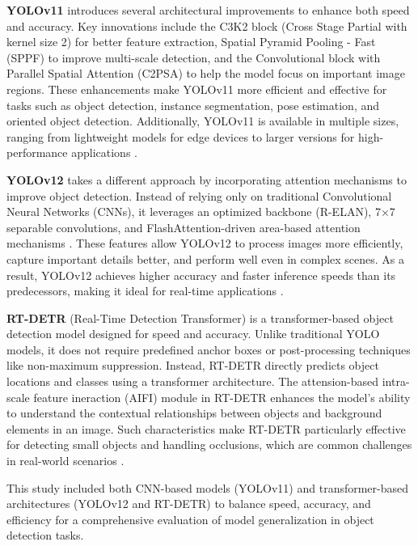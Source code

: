 \textbf{YOLOv11} introduces several architectural improvements to enhance both speed and accuracy. Key innovations include the C3K2 block (Cross Stage Partial with kernel size 2) for better feature extraction, Spatial Pyramid Pooling - Fast (SPPF) to improve multi-scale detection, and the Convolutional block with Parallel Spatial Attention (C2PSA) to help the model focus on important image regions. These enhancements make YOLOv11 more efficient and effective for tasks such as object detection, instance segmentation, pose estimation, and oriented object detection. Additionally, YOLOv11 is available in multiple sizes, ranging from lightweight models for edge devices to larger versions for high-performance applications \cite{ultralytics2024yolo11, khanam2024yolov11}.

\textbf{YOLOv12} takes a different approach by incorporating attention mechanisms to improve object detection. Instead of relying only on traditional Convolutional Neural Networks (CNNs), it leverages an optimized backbone (R-ELAN), 7×7 separable convolutions, and FlashAttention-driven area-based attention mechanisms \cite{dao2023flashattention, dao2022flashattention}. These features allow YOLOv12 to process images more efficiently, capture important details better, and perform well even in complex scenes. As a result, YOLOv12 achieves higher accuracy and faster inference speeds than its predecessors, making it ideal for real-time applications \cite{ultralytics2024yolo12, tian2025yolov12}.

\textbf{RT-DETR} (Real-Time Detection Transformer) is a transformer-based object detection model designed for speed and accuracy. Unlike traditional YOLO models, it does not require predefined anchor boxes or post-processing techniques like non-maximum suppression. Instead, RT-DETR directly predicts object locations and classes using a transformer architecture.  The attension-based intra-scale feature ineraction (AIFI) module in RT-DETR enhances the model's ability to understand the contextual relationships between objects and background elements in an image. Such characteristics make RT-DETR particularly effective for detecting small objects and handling occlusions, which are common challenges in real-world scenarios \cite{ultralytics2024detrt, carion2020end}.

This study included both CNN-based models (YOLOv11) and transformer-based architectures (YOLOv12 and RT-DETR) to balance speed, accuracy, and efficiency for a comprehensive evaluation of model generalization in object detection tasks.

